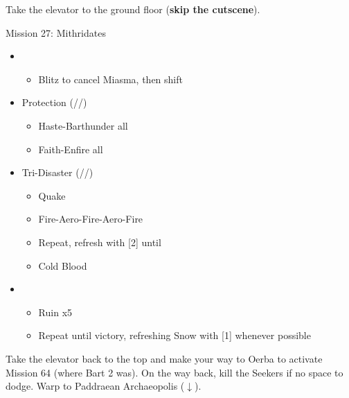 \renewcommand{\fifth}{[5] Protection (\syn/\sen/\med)}
\renewcommand{\sixth}{[6] Tri-Disaster (\rav/\rav/\rav)}

Take the elevator to the ground floor (\textbf{skip the cutscene}).
\vfill
\begin{battle}{Mission 27: Mithridates}
	\begin{itemize}
		\item \fourth
			\begin{itemize}
				\item Blitz to cancel Miasma, then shift
			\end{itemize}
		\item \fifth
			\begin{itemize}
				\item Haste-Barthunder all
				\item Faith-Enfire all
			\end{itemize}
		\item \sixth
			\begin{itemize}
				\item Quake
				\item Fire-Aero-Fire-Aero-Fire
				\item Repeat, refresh with [2] until \stagger
				\item Cold Blood
			\end{itemize}
		\item \third
			\begin{itemize}
				\item Ruin x5
				\item Repeat until victory, refreshing Snow with [1] whenever possible
			\end{itemize}
	\end{itemize}
\end{battle}

Take the elevator back to the top and make your way to Oerba to activate Mission 64 (where Bart 2 was).
On the way back, kill the Seekers if no space to dodge.
Warp to Paddraean Archaeopolis ($\downarrow$).

